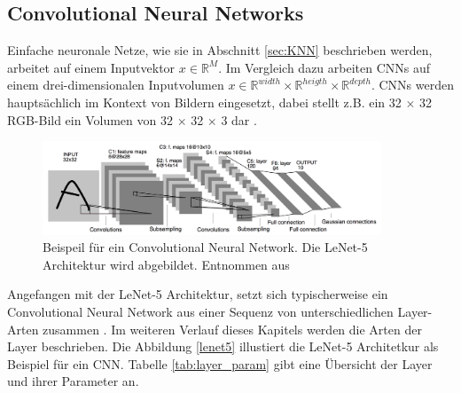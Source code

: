 \subsection{Convolutional Neural Networks}
\label{sec:CNN}
Einfache neuronale Netze, wie sie in Abschnitt \ref{sec:KNN} beschrieben werden, arbeitet auf einem Inputvektor $x \in \mathbb{R}^{M}$. Im Vergleich dazu arbeiten CNNs auf einem drei-dimensionalen Inputvolumen $x \in \mathbb{R}^{width} \times \mathbb{R}^{heigth} \times \mathbb{R}^{depth}$. CNNs werden hauptsächlich im Kontext von Bildern eingesetzt, dabei stellt z.B. ein 32 $\times$ 32 RGB-Bild ein Volumen von 32 $\times$ 32 $\times$ 3 dar \cite{CS231nConvolutionalNeurala}.

\begin{figure}[H]
	\centering
	\includegraphics[width=0.9\textwidth]{images/ann_conv/lenet5.png}
	\caption{Beispeil für ein Convolutional Neural Network. Die LeNet-5 Architektur wird abgebildet. Entnommen aus \cite{lecunGradientBasedLearningApplied1998}  }
	\label{fig:lenet5}
\end{figure}

Angefangen mit der LeNet-5 \cite{lecunGradientBasedLearningApplied1998} Architektur, setzt sich typischerweise ein Convolutional Neural Network aus einer Sequenz von unterschiedlichen Layer-Arten zusammen \cite{szegedyGoingDeeperConvolutions2015, CS231nConvolutionalNeurala}. Im weiteren Verlauf dieses Kapitels werden die Arten der Layer beschrieben. Die Abbildung \ref{lenet5} illustiert die LeNet-5 Architetkur als Beispiel für ein CNN.  Tabelle \ref{tab:layer_param} gibt eine Übersicht der Layer und ihrer Parameter an.


